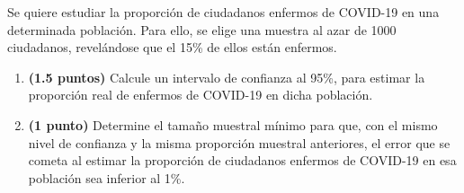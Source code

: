 
Se quiere estudiar la proporción de ciudadanos enfermos de COVID-19 en una
determinada población. Para ello, se elige una muestra al azar de 1000
ciudadanos, revelándose que el 15\% de ellos están enfermos.
\begin{enumerate}[label=\alph*)]
  \item \textbf{(1.5 puntos)} Calcule un intervalo de confianza al 95\%,
  para estimar la proporción real de enfermos de COVID-19 en dicha población.
  \item \textbf{(1 punto)} Determine el tamaño muestral mínimo para que,
  con el mismo nivel de confianza y la misma proporción muestral anteriores,
  el error que se cometa al estimar la proporción de ciudadanos enfermos de
  COVID-19 en esa población sea inferior al 1\%.
\end{enumerate}

